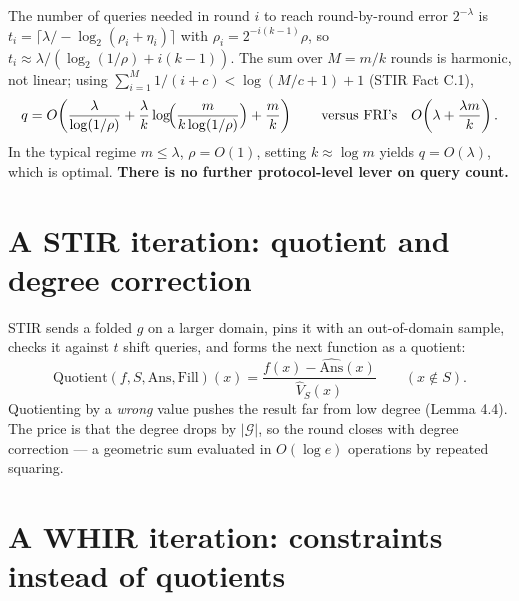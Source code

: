 \documentclass[11pt,a4paper]{article}
\begin{document}
\medskip
\noindent{}
\medskip

The number of queries needed in round $i$ to reach round-by-round error $2^{-\lambda}$ is
$t_{i}=\lceil \lambda / -\log_{2}(\rho_{i}+\eta_{i})\rceil$ with
$\rho_{i}=2^{-i(k-1)}\rho$, so $t_{i}\approx\lambda/(\log_{2}(1/\rho)+i(k-1))$. The sum over
$M=m/k$ rounds is harmonic, not linear; using $\sum_{i=1}^{M}1/(i+c)<\log(M/c+1)+1$ (STIR
Fact C.1),
\[
  q = O\!\left(\frac{\lambda}{\log(1/\rho)}
    + \frac{\lambda}{k}\log\!\Bigl(\frac{m}{k\log(1/\rho)}\Bigr)
    + \frac{m}{k}\right)
  \qquad\text{versus FRI's}\quad O\!\left(\lambda+\frac{\lambda m}{k}\right).
\]
In the typical regime $m\le\lambda$, $\rho=O(1)$, setting $k\approx\log m$ yields $q=O(\lambda)$,
which is optimal. \textbf{There is no further protocol-level lever on query count.}

\section{A STIR iteration: quotient and degree correction}

STIR sends a folded $g$ on a larger domain, pins it with an out-of-domain sample, checks it against
$t$ shift queries, and forms the next function as a quotient:
\[
  \mathrm{Quotient}(f,S,\mathrm{Ans},\mathrm{Fill})(x)
  =\frac{f(x)-\widehat{\mathrm{Ans}}(x)}{\hat V_{S}(x)}\qquad (x\notin S).
\]
Quotienting by a \emph{wrong} value pushes the result far from low degree (Lemma 4.4). The price is
that the degree drops by $|\mathcal{G}|$, so the round closes with degree correction --- a geometric
sum evaluated in $O(\log e)$ operations by repeated squaring.

\section{A WHIR iteration: constraints instead of quotients}
\end{document}
